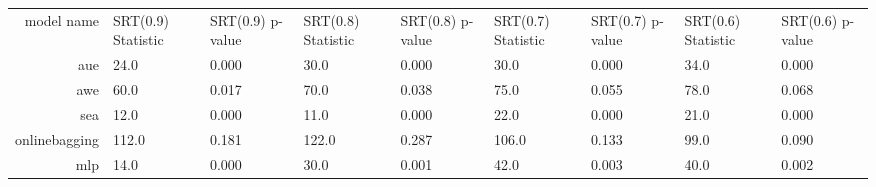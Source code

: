 \begin{tabular}{|r|l|l|l|l|l|l|l|l|}
  \hline
  model name & SRT(0.9) Statistic & SRT(0.9) p-value & SRT(0.8) Statistic & SRT(0.8) p-value & SRT(0.7) Statistic & SRT(0.7) p-value & SRT(0.6) Statistic & SRT(0.6) p-value \\ 
  aue & 24.0 & 0.000 & 30.0 & 0.000 & 30.0 & 0.000 & 34.0 & 0.000 \\ 
  awe & 60.0 & 0.017 & 70.0 & 0.038 & 75.0 & 0.055 & 78.0 & 0.068 \\ 
  sea & 12.0 & 0.000 & 11.0 & 0.000 & 22.0 & 0.000 & 21.0 & 0.000 \\ 
  onlinebagging & 112.0 & 0.181 & 122.0 & 0.287 & 106.0 & 0.133 & 99.0 & 0.090 \\ 
  mlp & 14.0 & 0.000 & 30.0 & 0.001 & 42.0 & 0.003 & 40.0 & 0.002 \\ 
\end{tabular}
